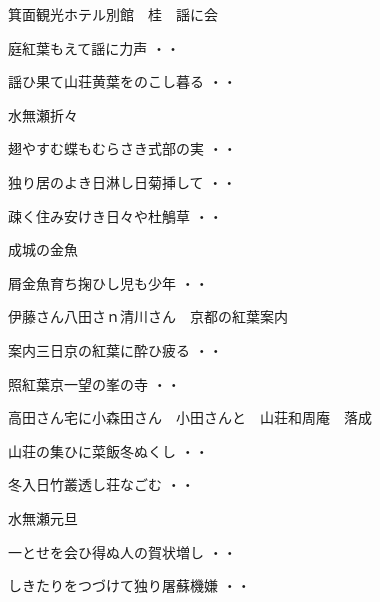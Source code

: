 \vspace{0.6cm}
箕面観光ホテル別館　桂　謡に会
\begin{shiika}庭紅葉もえて謡に力声
\hfill{・・}\end{shiika}
\begin{shiika}謡ひ果て山荘黄葉をのこし暮る
\hfill{・・}\end{shiika}
\vspace{0.6cm}
水無瀬折々
\begin{shiika}翅やすむ蝶もむらさき式部の実
\hfill{・・}\end{shiika}
\begin{shiika}独り居のよき日淋し日菊挿して
\hfill{・・}\end{shiika}
\begin{shiika}疎く住み安けき日々や杜鵤草
\hfill{・・}\end{shiika}
\vspace{0.6cm}
成城の金魚
\begin{shiika}屑金魚育ち掬ひし児も少年
\hfill{・・}\end{shiika}
\vspace{0.6cm}
伊藤さん八田さｎ清川さん　京都の紅葉案内
\begin{shiika}案内三日京の紅葉に酔ひ疲る
\hfill{・・}\end{shiika}
\vspace{0.6cm}
\begin{shiika}照紅葉京一望の峯の寺
\hfill{・・}\end{shiika}
\vspace{0.6cm}
高田さん宅に小森田さん　小田さんと　山荘和周庵　落成
\begin{shiika}山荘の集ひに菜飯冬ぬくし
\hfill{・・}\end{shiika}
\begin{shiika}冬入日竹叢透し荘なごむ
\hfill{・・}\end{shiika}
\vspace{0.6cm}
水無瀬元旦
\begin{shiika}一とせを会ひ得ぬ人の賀状増し
\hfill{・・}\end{shiika}
\begin{shiika}しきたりをつづけて独り屠蘇機嫌
\hfill{・・}\end{shiika}
